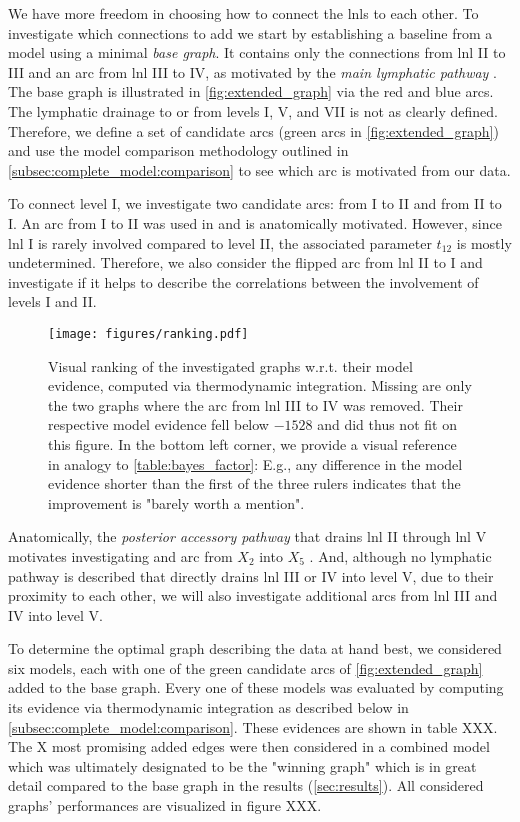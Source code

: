 \documentclass[twocolumn]{aastex631}
\begin{document}
We have more freedom in choosing how to connect the \glspl{lnl} to each other. To investigate which connections to add we start by establishing a baseline from a model using a minimal \emph{base graph}. It contains only the connections from \gls{lnl} II to III and an arc from \gls{lnl} III to IV, as motivated by the \emph{main lymphatic pathway} \cite{lengele_anatomical_2007}. The base graph is illustrated in \cref{fig:extended_graph} via the red and blue arcs. The lymphatic drainage to or from levels I, V, and VII is not as clearly defined. Therefore, we define a set of candidate arcs (green arcs in \cref{fig:extended_graph}) and use the model comparison methodology outlined in \cref{subsec:complete_model:comparison} to see which arc is motivated from our data. 

To connect level I, we investigate two candidate arcs: from I to II and from II to I. An arc from I to II was used in \cite{pouymayou_bayesian_2019,ludwig_hidden_2021} and is anatomically motivated. However, since \gls{lnl} I is rarely involved compared to level II, the associated parameter $t_{12}$ is mostly undetermined. Therefore, we also consider the flipped arc from \gls{lnl} II to I and investigate if it helps to describe the correlations between the involvement of levels I and II.

\begin{figure*}
    \centering
    \texttt{[image: figures/ranking.pdf]}
    \caption{Visual ranking of the investigated graphs w.r.t. their model evidence, computed via thermodynamic integration. Missing are only the two graphs where the arc from \gls{lnl} III to IV was removed. Their respective model evidence fell below $-1528$ and did thus not fit on this figure. In the bottom left corner, we provide a visual reference in analogy to \cref{table:bayes_factor}: E.g., any difference in the model evidence shorter than the first of the three rulers indicates that the improvement is "barely worth a mention".}
    \label{fig:ranking}
\end{figure*}

Anatomically, the \emph{posterior accessory pathway} that drains \gls{lnl} II through \gls{lnl} V motivates investigating and arc from $X_2$ into $X_5$ \cite{lengele_anatomical_2007}. And, although no lymphatic pathway is described that directly drains \gls{lnl} III or IV into level V, due to their proximity to each other, we will also investigate additional arcs from \gls{lnl} III and IV into level V.

To determine the optimal graph describing the data at hand best, we considered six models, each with one of the green candidate arcs of \cref{fig:extended_graph} added to the base graph. Every one of these models was evaluated by computing its evidence via thermodynamic integration as described below in \cref{subsec:complete_model:comparison}. These evidences are shown in table XXX. The X most promising added edges were then considered in a combined model which was ultimately designated to be the "winning graph" which is in great detail compared to the base graph in the results (\cref{sec:results}). All considered graphs' performances are visualized in figure XXX.
\end{document}
